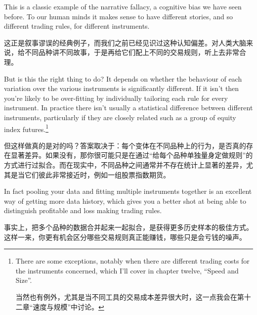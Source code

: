 \bipairgap

\begin{englishblock} This is a classic example of the narrative fallacy, a cognitive bias we have seen before. To our human minds it makes sense to have different stories, and so different trading rules, for different instruments. \end{englishblock}

\begin{chineseblock}这正是叙事谬误的经典例子，而我们之前已经见识过这种认知偏差。对人类大脑来说，给不同品种讲不同故事，于是再给它们配上不同的交易规则，听上去非常合理。\end{chineseblock}

\bipairgap

\begin{englishblock} But is this the right thing to do? It depends on whether the behaviour of each variation over the various instruments is significantly different. If it isn't then you're likely to be over-fitting by individually tailoring each rule for every instrument. In practice there isn't usually a statistical difference between different instruments, particularly if they are closely related such as a group of equity index futures.\footnote{There are some exceptions, notably when there are different trading costs for the instruments concerned, which I'll cover in chapter twelve, ``Speed and Size''. \par 当然也有例外，尤其是当不同工具的交易成本差异很大时，这一点我会在第十二章“速度与规模”中讨论。}\end{englishblock}

\begin{chineseblock}但这样做真的是对的吗？答案取决于：每个变体在不同品种上的行为，是否真的存在显著差异。如果没有，那你很可能只是在通过“给每个品种单独量身定做规则”的方式进行过拟合。而在现实中，不同品种之间通常并不存在统计上显著的差异，尤其是当它们彼此非常接近时，例如一组股票指数期货。\end{chineseblock}

\bipairgap

\begin{englishblock} In fact pooling your data and fitting multiple instruments together is an excellent way of getting more data history, which gives you a better shot at being able to distinguish profitable and loss making trading rules. \end{englishblock}

\begin{chineseblock}事实上，把多个品种的数据合并起来一起拟合，是获得更多历史样本的极佳方式。这样一来，你更有机会区分哪些交易规则真正能赚钱，哪些只是会亏钱的噪声。\end{chineseblock}

